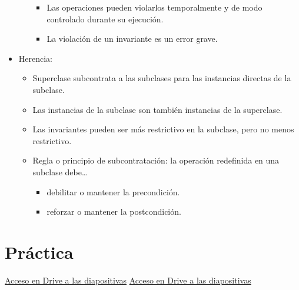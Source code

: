 \documentclass[12pt, twoside, openright]{report} %
\begin{document}
\begin{itemize}
\begin{itemize}
        \begin{itemize}
        
        \item
          Las operaciones pueden violarlos temporalmente y de modo
          controlado durante su ejecución.
        \item
          La violación de un invariante es un error grave.
        \end{itemize}
      \end{itemize}

	  \item
      Herencia:

      \begin{itemize}
      
      \item
        Superclase subcontrata a las subclases para las instancias
        directas de la subclase.
      \item
        Las instancias de la subclase son también instancias de la
        superclase.
      \item
        Las invariantes pueden ser más restrictivo en la subclase, pero
        no menos restrictivo.
      \item
        Regla o principio de subcontratación: la operación redefinida en
        una subclase debe\ldots{}

        \begin{itemize}
			\item
			debilitar o mantener la precondición.
			\item
			reforzar o mantener la postcondición.
        \end{itemize}
      
      \end{itemize}
    \end{itemize}

\chapter{Práctica}
  \href{https://drive.google.com/file/d/1IhzCxpn9bw1jV66XE93b-A02epnFmA8a}{Acceso en Drive a las diapositivas}
  \href{https://drive.google.com/file/d/1HdEk5KGfG1DJno3Ffo59KatrJkHLz81p}{Acceso en Drive a las diapositivas}
\end{document}
